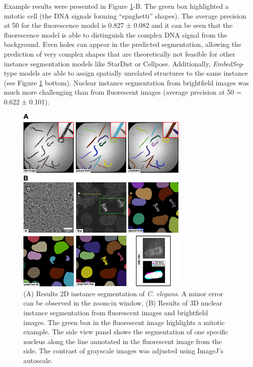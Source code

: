 Example results were presented in Figure \ref{fig:instance}-B. The green box highlighted a mitotic cell (the DNA signals forming ``spaghetti'' shapes). The average precision at 50 for the fluorescence model is 0.827 ± 0.082 and it can be seen that the fluorescence model is able to distinguish the complex DNA signal from the background. Even holes can appear in the predicted segmentation, allowing the prediction of very complex shapes that are theoretically not feasible for other instance segmentation models like StarDist or Cellpose. Additionally, \emph{EmbedSeg}-type models are able to assign spatially unrelated structures to the same instance (see Figure \ref{fig:instance} bottom). Nuclear instance segmentation from brightfield images was much more challenging than from fluorescent images (average precision at 50 = 0.622 ± 0.101).

\begin{figure}
\hypertarget{fig:instance}{%
\centering
\includegraphics[width=0.75\textwidth,height=\textheight]{images/instance_seg_justin.png}
\caption{(A) Results 2D instance segmentation of \emph{C. elegans}. A minor error can be observed in the zoom-in window. (B) Results of 3D nuclear instance segmentation from fluorescent images and brightfield images. The green box in the fluorescent image highlights a mitotic example. The side view panel shows the segmentation of one specific nucleus along the line annotated in the fluorescent image from the side. The contrast of grayscale images was adjusted using ImageJ's autoscale.}\label{fig:instance}
}
\end{figure}

